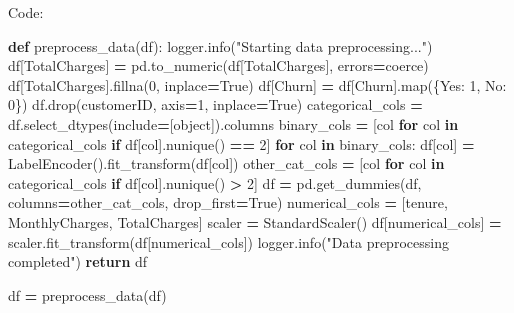 \documentclass[preprint, 3p,
authoryear]{elsarticle} %
\newenvironment{Shaded}{\begin{snugshade}}{\end{snugshade}}
\newcommand{\BuiltInTok}[1]{#1}
\newcommand{\ControlFlowTok}[1]{\textcolor[rgb]{0.13,0.29,0.53}{\textbf{#1}}}
\newcommand{\DecValTok}[1]{\textcolor[rgb]{0.00,0.00,0.81}{#1}}
\newcommand{\KeywordTok}[1]{\textcolor[rgb]{0.13,0.29,0.53}{\textbf{#1}}}
\newcommand{\NormalTok}[1]{#1}
\newcommand{\OperatorTok}[1]{\textcolor[rgb]{0.81,0.36,0.00}{\textbf{#1}}}
\newcommand{\StringTok}[1]{\textcolor[rgb]{0.31,0.60,0.02}{#1}}
\newcommand{\VariableTok}[1]{\textcolor[rgb]{0.00,0.00,0.00}{#1}}
\begin{document}
Code:

\begin{Shaded}
\begin{Highlighting}[]

\KeywordTok{def}\NormalTok{ preprocess\_data(df):}
\NormalTok{    logger.info(}\StringTok{"Starting data preprocessing..."}\NormalTok{)}
\NormalTok{    df[}\StringTok{\textquotesingle{}TotalCharges\textquotesingle{}}\NormalTok{] }\OperatorTok{=}\NormalTok{ pd.to\_numeric(df[}\StringTok{\textquotesingle{}TotalCharges\textquotesingle{}}\NormalTok{], errors}\OperatorTok{=}\StringTok{\textquotesingle{}coerce\textquotesingle{}}\NormalTok{)}
\NormalTok{    df[}\StringTok{\textquotesingle{}TotalCharges\textquotesingle{}}\NormalTok{].fillna(}\DecValTok{0}\NormalTok{, inplace}\OperatorTok{=}\VariableTok{True}\NormalTok{)}
\NormalTok{    df[}\StringTok{\textquotesingle{}Churn\textquotesingle{}}\NormalTok{] }\OperatorTok{=}\NormalTok{ df[}\StringTok{\textquotesingle{}Churn\textquotesingle{}}\NormalTok{].}\BuiltInTok{map}\NormalTok{(\{}\StringTok{\textquotesingle{}Yes\textquotesingle{}}\NormalTok{: }\DecValTok{1}\NormalTok{, }\StringTok{\textquotesingle{}No\textquotesingle{}}\NormalTok{: }\DecValTok{0}\NormalTok{\})}
\NormalTok{    df.drop(}\StringTok{\textquotesingle{}customerID\textquotesingle{}}\NormalTok{, axis}\OperatorTok{=}\DecValTok{1}\NormalTok{, inplace}\OperatorTok{=}\VariableTok{True}\NormalTok{)}
\NormalTok{    categorical\_cols }\OperatorTok{=}\NormalTok{ df.select\_dtypes(include}\OperatorTok{=}\NormalTok{[}\StringTok{\textquotesingle{}object\textquotesingle{}}\NormalTok{]).columns}
\NormalTok{    binary\_cols }\OperatorTok{=}\NormalTok{ [col }\ControlFlowTok{for}\NormalTok{ col }\KeywordTok{in}\NormalTok{ categorical\_cols }\ControlFlowTok{if}\NormalTok{ df[col].nunique() }\OperatorTok{==} \DecValTok{2}\NormalTok{]}
    \ControlFlowTok{for}\NormalTok{ col }\KeywordTok{in}\NormalTok{ binary\_cols:}
\NormalTok{        df[col] }\OperatorTok{=}\NormalTok{ LabelEncoder().fit\_transform(df[col])}
\NormalTok{    other\_cat\_cols }\OperatorTok{=}\NormalTok{ [col }\ControlFlowTok{for}\NormalTok{ col }\KeywordTok{in}\NormalTok{ categorical\_cols }\ControlFlowTok{if}\NormalTok{ df[col].nunique() }\OperatorTok{\textgreater{}} \DecValTok{2}\NormalTok{]}
\NormalTok{    df }\OperatorTok{=}\NormalTok{ pd.get\_dummies(df, columns}\OperatorTok{=}\NormalTok{other\_cat\_cols, drop\_first}\OperatorTok{=}\VariableTok{True}\NormalTok{)}
\NormalTok{    numerical\_cols }\OperatorTok{=}\NormalTok{ [}\StringTok{\textquotesingle{}tenure\textquotesingle{}}\NormalTok{, }\StringTok{\textquotesingle{}MonthlyCharges\textquotesingle{}}\NormalTok{, }\StringTok{\textquotesingle{}TotalCharges\textquotesingle{}}\NormalTok{]}
\NormalTok{    scaler }\OperatorTok{=}\NormalTok{ StandardScaler()}
\NormalTok{    df[numerical\_cols] }\OperatorTok{=}\NormalTok{ scaler.fit\_transform(df[numerical\_cols])}
\NormalTok{    logger.info(}\StringTok{"Data preprocessing completed"}\NormalTok{)}
    \ControlFlowTok{return}\NormalTok{ df}

\NormalTok{df }\OperatorTok{=}\NormalTok{ preprocess\_data(df)}
\end{Highlighting}
\end{Shaded}
\end{document}
